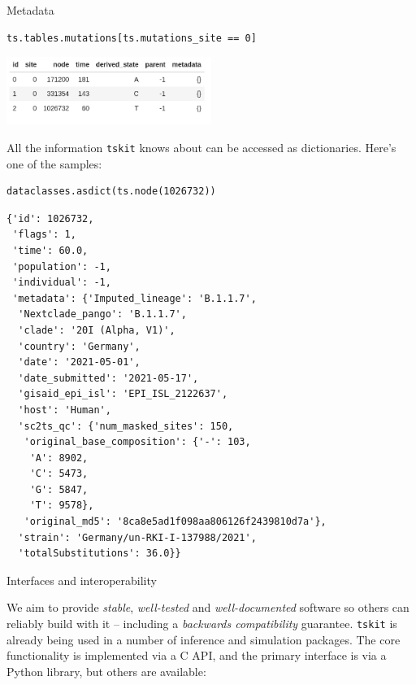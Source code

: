 \documentclass[landscape,a0paper,fontscale=0.5]{baposter}
\newcommand{\tskit}{{\texttt{tskit}}}
\begin{document}
\begin{poster}
\begin{posterbox}[name=inout,column=0,span=1]{Metadata}
\begin{multicols}{2}
\begin{verbatim}
ts.tables.mutations[ts.mutations_site == 0]
\end{verbatim}
\includegraphics[width=0.5\textwidth]{sc2_muts}
\end{multicols}

All the information \tskit{} knows about can be accessed
as dictionaries.
Here's one of the samples:

\tiny
\begin{verbatim}
dataclasses.asdict(ts.node(1026732))
\end{verbatim}
\tiny
\begin{verbatim}
{'id': 1026732,
 'flags': 1,
 'time': 60.0,
 'population': -1,
 'individual': -1,
 'metadata': {'Imputed_lineage': 'B.1.1.7',
  'Nextclade_pango': 'B.1.1.7',
  'clade': '20I (Alpha, V1)',
  'country': 'Germany',
  'date': '2021-05-01',
  'date_submitted': '2021-05-17',
  'gisaid_epi_isl': 'EPI_ISL_2122637',
  'host': 'Human',
  'sc2ts_qc': {'num_masked_sites': 150,
   'original_base_composition': {'-': 103,
    'A': 8902,
    'C': 5473,
    'G': 5847,
    'T': 9578},
   'original_md5': '8ca8e5ad1f098aa806126f2439810d7a'},
  'strain': 'Germany/un-RKI-I-137988/2021',
  'totalSubstitutions': 36.0}}
\end{verbatim}

\end{posterbox}

\begin{posterbox}[name=interop,column=0,row=0,span=2,below=inout]{Interfaces and interoperability}

\begin{multicols}{2}

We aim to provide \emph{stable}, \emph{well-tested} and \emph{well-documented}
software so others can reliably build with it --
including a \emph{backwards compatibility} guarantee.
\tskit{} is already being used in a number of inference and simulation packages.
The core functionality is implemented via a C API,
and the primary interface is via a Python library,
but others are available:


\end{multicols}
\end{posterbox}
\end{poster}
\end{document}
